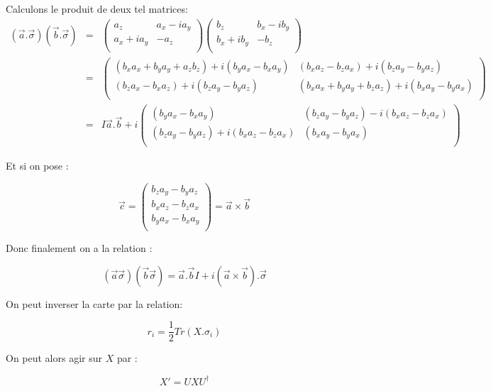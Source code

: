 \documentclass[12pt,a4paper]{article}
\begin{document}
Calculons le produit de deux tel matrices:
\begin{eqnarray*}
(\vec{a}.\vec{\sigma}) (\vec{b}.\vec{\sigma})&=&\begin{pmatrix}
a_z&a_x-i a_y\\
a_x+i a_y&-a_z\\
\end{pmatrix}
\begin{pmatrix}
b_z&b_x-i b_y\\
b_x+i b_y&-b_z\\
\end{pmatrix}\\
&=&
\begin{pmatrix}
(b_x a_x+ b_y a_y+a_z b_z)  +i (b_y a_x- b_x a_y)& (b_x a_z- b_z a_x) + i (b_z a_y- b_y a_z)  \\
(b_z a_x  - b_x a_z) + i(b_z a_y-b_y a_z)& (b_x a_x +b_y a_y+ b_z a_z)+ i (b_x a_y - b_y a_x )\\
\end{pmatrix}\\
&=&
I \vec{a}.\vec{b}+ i\begin{pmatrix}
(b_y a_x- b_x a_y)&   (b_z a_y- b_y a_z)-i(b_x a_z- b_z a_x)  \\
 (b_z a_y-b_y a_z)+i(b_x a_z - b_z a_x)& (b_x a_y - b_y a_x )\\
\end{pmatrix}
\end{eqnarray*}

Et si on pose :

\[
\vec{c}=\begin{pmatrix}
b_z a_y- b_y a_z\\
b_x a_z- b_z a_x\\
b_y a_x- b_x a_y\\
\end{pmatrix}= \vec{a}\times\vec{b}
\]

Donc finalement on a la relation :

\[
 \boxed{ (\vec{a}\vec{\sigma}) (\vec{b}\vec{\sigma}) = \vec{a}.\vec{b} I + i(\vec{a}\times\vec{b}).\vec{\sigma}}
\]

On peut inverser la carte par la relation:

\[
\boxed{r_i= \frac{1}{2} Tr(X.\sigma_i)}
\]

On peut alors agir sur $X$ par :

\[
	\boxed{ X'=U X U^{\dagger} }
\]
\end{document}

